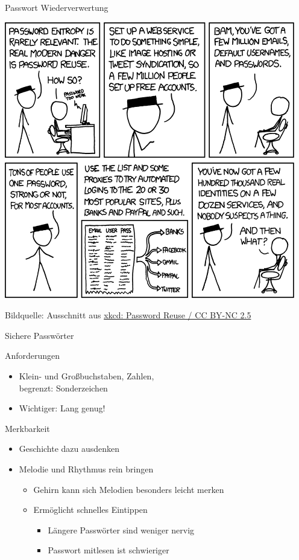 \begin{frame}{Passwort Wiederverwertung}
  \begin{center}
    \includegraphics[height=0.8\textheight]{images/password_reuse_top.png}\\
  \end{center}
  \tiny Bildquelle: Ausschnitt aus \href{http://xkcd.com/792/}{xkcd: Password Reuse / CC BY-NC 2.5}
\end{frame}

\begin{frame}{Sichere Passwörter}
  \begin{block}{Anforderungen}
  \begin{itemize}
    \item Klein- und Großbuchstaben, Zahlen,\\ begrenzt: Sonderzeichen
    \item Wichtiger: Lang genug!
  \end{itemize}
  \end{block}
  \begin{block}{Merkbarkeit}
  \begin{itemize}
    \item Geschichte dazu ausdenken
    \item Melodie und Rhythmus rein bringen
    \begin{itemize}
      \item Gehirn kann sich Melodien besonders leicht merken
      \item Ermöglicht schnelles Eintippen
      \begin{itemize}
        \item Längere Passwörter sind weniger nervig
        \item Passwort mitlesen ist schwieriger
      \end{itemize}
    \end{itemize}
  \end{itemize}
  \end{block}
\end{frame}


